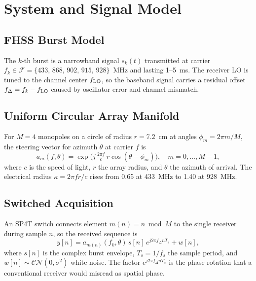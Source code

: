 \documentclass[conference]{IEEEtran}
\begin{document}
\section{System and Signal Model}\label{sec:model}
\subsection{FHSS Burst Model}
The $k$-th burst is a narrowband signal $s_k(t)$ transmitted at carrier $f_k \in \mathcal{F}=\{433,\,868,\,902,\,915,\,928\}$~MHz and lasting 1--5~ms. The receiver LO is tuned to the channel center $f_{\rm LO}$, so the baseband signal carries a residual offset $f_\Delta = f_k - f_{\rm LO}$ caused by oscillator error and channel mismatch.

\subsection{Uniform Circular Array Manifold}
For $M=4$ monopoles on a circle of radius $r=7.2$~cm at angles $\phi_m = 2\pi m/M$, the steering vector for azimuth $\theta$ at carrier $f$ is
\begin{equation}
\boxed{a_m(f,\theta)=\exp\!\Big(j\,\tfrac{2\pi f}{c}\,r\cos(\theta-\phi_m)\Big)},\quad m=0,\dots,M-1,
\label{eq:steer}
\end{equation}
where $c$ is the speed of light, $r$ the array radius, and $\theta$ the azimuth of arrival. The electrical radius $\kappa=2\pi f r/c$ rises from 0.65 at 433~MHz to 1.40 at 928~MHz.

\subsection{Switched Acquisition}
An SP4T switch connects element $m(n)=n \bmod M$ to the single receiver during sample $n$, so the received sequence is
\begin{equation}
\boxed{y[n]=a_{m(n)}(f_k,\theta)\,s[n]\,e^{j2\pi f_\Delta nT_s}+w[n]},
\label{eq:switched}
\end{equation}
where $s[n]$ is the complex burst envelope, $T_s=1/f_s$ the sample period, and $w[n]\sim\mathcal{CN}(0,\sigma^2)$ white noise. The factor $e^{j2\pi f_\Delta nT_s}$ is the phase rotation that a conventional receiver would misread as spatial phase.
\end{document}
